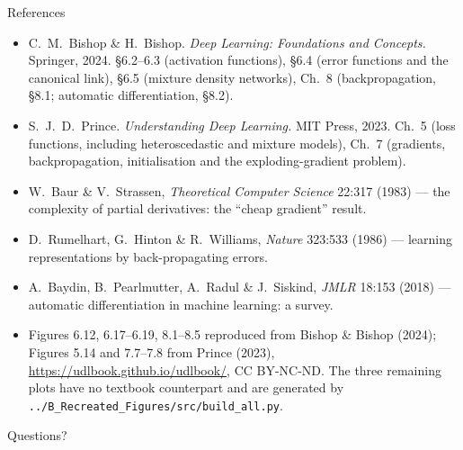 \documentclass[aspectratio=169, 11pt]{beamer}
\newcommand{\nosrc}{}       %
\begin{document}
\begin{frame}{References}
  \nosrc
  \scriptsize
  \begin{itemize}\setlength{\itemsep}{2pt}
    \item C.~M.~Bishop \& H.~Bishop. \textit{Deep Learning: Foundations
          and Concepts.} Springer, 2024. \S6.2--6.3 (activation
          functions), \S6.4 (error functions and the canonical link),
          \S6.5 (mixture density networks), Ch.~8 (backpropagation,
          \S8.1; automatic differentiation, \S8.2).
    \item S.~J.~D.~Prince. \textit{Understanding Deep Learning.}
          MIT Press, 2023. Ch.~5 (loss functions, including
          heteroscedastic and mixture models), Ch.~7 (gradients,
          backpropagation, initialisation and the exploding-gradient
          problem).
    \item W.~Baur \& V.~Strassen, \textit{Theoretical Computer Science}
          22:317 (1983) --- the complexity of partial derivatives:
          the ``cheap gradient'' result.
    \item D.~Rumelhart, G.~Hinton \& R.~Williams, \textit{Nature}
          323:533 (1986) --- learning representations by
          back-propagating errors.
    \item A.~Baydin, B.~Pearlmutter, A.~Radul \& J.~Siskind,
          \textit{JMLR} 18:153 (2018) --- automatic differentiation in
          machine learning: a survey.
    \item Figures 6.12, 6.17--6.19, 8.1--8.5 reproduced from Bishop \&
          Bishop (2024); Figures 5.14 and 7.7--7.8 from Prince (2023),
          \url{https://udlbook.github.io/udlbook/}, CC BY-NC-ND. The
          three remaining plots have no textbook counterpart and are
          generated by
          \texttt{../B\_Recreated\_Figures/src/build\_all.py}.
  \end{itemize}
\end{frame}

\begin{frame}[standout]
  \nosrc
  Questions?
\end{frame}
\end{document}
